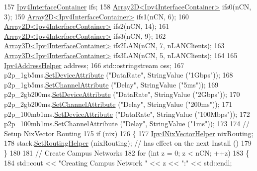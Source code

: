 \begin{DoxyCode}
157   \hyperlink{classns3_1_1Ipv4InterfaceContainer}{Ipv4InterfaceContainer} ifs;
158   \hyperlink{classArray2D}{Array2D<Ipv4InterfaceContainer>} ifs0(nCN, 3);
159   \hyperlink{classArray2D}{Array2D<Ipv4InterfaceContainer>} ifs1(nCN, 6);
160   \hyperlink{classArray2D}{Array2D<Ipv4InterfaceContainer>} ifs2(nCN, 14);
161   \hyperlink{classArray2D}{Array2D<Ipv4InterfaceContainer>} ifs3(nCN, 9);
162   \hyperlink{classArray3D}{Array3D<Ipv4InterfaceContainer>} ifs2LAN(nCN, 7, nLANClients);
163   \hyperlink{classArray3D}{Array3D<Ipv4InterfaceContainer>} ifs3LAN(nCN, 5, nLANClients);
164 
165   \hyperlink{classns3_1_1Ipv4AddressHelper}{Ipv4AddressHelper} address;
166   std::ostringstream oss;
167   p2p\_1gb5ms.\hyperlink{classns3_1_1PointToPointHelper_a4577f5ab8c387e5528af2e0fbab1152e}{SetDeviceAttribute} (\textcolor{stringliteral}{"DataRate"}, StringValue (\textcolor{stringliteral}{"1Gbps"}));
168   p2p\_1gb5ms.\hyperlink{classns3_1_1PointToPointHelper_a6b5317fd17fb61e5a53f8d66a90b63b9}{SetChannelAttribute} (\textcolor{stringliteral}{"Delay"}, StringValue (\textcolor{stringliteral}{"5ms"}));
169   p2p\_2gb200ms.\hyperlink{classns3_1_1PointToPointHelper_a4577f5ab8c387e5528af2e0fbab1152e}{SetDeviceAttribute} (\textcolor{stringliteral}{"DataRate"}, StringValue (\textcolor{stringliteral}{"2Gbps"}));
170   p2p\_2gb200ms.\hyperlink{classns3_1_1PointToPointHelper_a6b5317fd17fb61e5a53f8d66a90b63b9}{SetChannelAttribute} (\textcolor{stringliteral}{"Delay"}, StringValue (\textcolor{stringliteral}{"200ms"}));
171   p2p\_100mb1ms.\hyperlink{classns3_1_1PointToPointHelper_a4577f5ab8c387e5528af2e0fbab1152e}{SetDeviceAttribute} (\textcolor{stringliteral}{"DataRate"}, StringValue (\textcolor{stringliteral}{"100Mbps"}));
172   p2p\_100mb1ms.\hyperlink{classns3_1_1PointToPointHelper_a6b5317fd17fb61e5a53f8d66a90b63b9}{SetChannelAttribute} (\textcolor{stringliteral}{"Delay"}, StringValue (\textcolor{stringliteral}{"1ms"}));
173 
174   \textcolor{comment}{// Setup NixVector Routing}
175   \textcolor{keywordflow}{if} (nix)
176     \{
177       \hyperlink{classns3_1_1Ipv4NixVectorHelper}{Ipv4NixVectorHelper} nixRouting;
178       stack.\hyperlink{classns3_1_1InternetStackHelper_a3e382c02df022dec79952a7eca8cd5ba}{SetRoutingHelper} (nixRouting); \textcolor{comment}{// has effect on the next Install ()}
179     \}
180 
181   \textcolor{comment}{// Create Campus Networks}
182   \textcolor{keywordflow}{for} (\textcolor{keywordtype}{int} z = 0; z < nCN; ++z) 
183     \{
184       std::cout << \textcolor{stringliteral}{"Creating Campus Network "} << z << \textcolor{stringliteral}{":"} << std::endl;

\end{DoxyCode}
